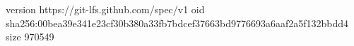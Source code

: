 version https://git-lfs.github.com/spec/v1
oid sha256:00bea39e341e23cf30b380a33fb7bdcef37663bd9776693a6aaf2a5f132bbdd4
size 970549
